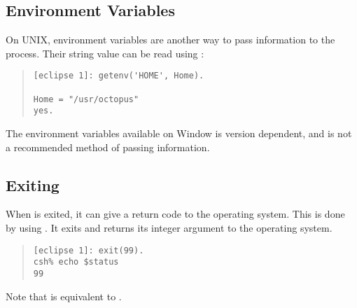 \subsection{Environment Variables}
On UNIX, environment variables are another way to pass information to the
{\eclipse} process. Their string value can be read using
:
\begin{quote}
\begin{verbatim}
[eclipse 1]: getenv('HOME', Home).

Home = "/usr/octopus"
yes.
\end{verbatim}
\end{quote}

The environment variables available on Window is version dependent, and is
not a recommended method of passing information.

\subsection{Exiting {\eclipse}}
When {\eclipse} is exited, it can give a return code to the operating system.
This is done by using . It
exits {\eclipse} and returns its integer
argument to the operating system.
\begin{quote}
\begin{verbatim}
[eclipse 1]: exit(99).
csh% echo $status
99
\end{verbatim}
\end{quote}
Note that  is equivalent to .

